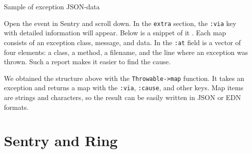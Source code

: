 \begin{listing}[ht!]

\ifx\DEVICETYPE\MOBILE

\begin{english}
  \begin{json}
  \end{json}
\end{english}

\else

\begin{english}
  \begin{json}
  \end{json}
\end{english}

\fi

  \caption{ Sample of exception JSON-data}
  \label{fig:ex-json-data}
\end{listing}

Open the event in Sentry and scroll down. In the \verb|extra| section, the \verb|:via| key with detailed information will appear. Below is a snippet of it . Each map consists of an exception class, message, and data. In the \verb|:at| field is a vector of four elements: a class, a method, a filename, and the line where an exception was thrown. Such a report makes it easier to find the cause.


We obtained the structure above with the \texttt{Throw\-able->map} function. It takes an exception and returns a map with the \verb|:via|, \verb|:cause|, and other keys.
Map items are strings and characters, so the result can be easily written in JSON or EDN formats.

\section{Sentry and Ring}

